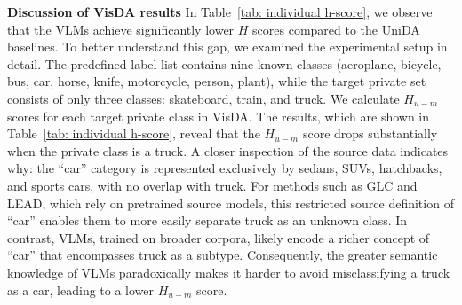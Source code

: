 \documentclass[10pt]{article} %
\begin{document}
\textbf{Discussion of VisDA results}
In Table~\ref{tab: individual h-score}, we observe that the VLMs achieve significantly lower $H$ scores compared to the UniDA baselines.
To better understand this gap, we examined the experimental setup in detail. 
The predefined label list contains nine known classes (aeroplane, bicycle, bus, car, horse, knife, motorcycle, person, plant), while the target private set consists of only three classes: skateboard, train, and truck.
We calculate $H_{u-m}$ scores for each target private class in VisDA.
The results, which are shown in Table~\ref{tab: individual h-score}, reveal that the $H_{u-m}$ score drops substantially when the private class is a truck.
A closer inspection of the source data indicates why: the ``car'' category is represented exclusively by sedans, SUVs, hatchbacks, and sports cars, with no overlap with truck.
For methods such as GLC and LEAD, which rely on pretrained source models, this restricted source definition of ``car'' enables them to more easily separate truck as an unknown class.
In contrast, VLMs, trained on broader corpora, likely encode a richer concept of ``car'' that encompasses truck as a subtype.
Consequently, the greater semantic knowledge of VLMs paradoxically makes it harder to avoid misclassifying a truck as a car, leading to a lower $H_{u-m}$ score.
\end{document}
